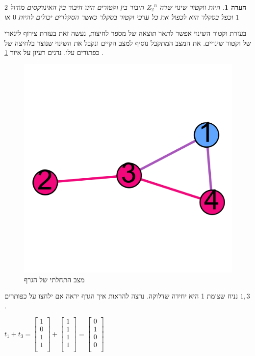 \documentclass[12pt,twoside]{article}
\newtheorem{comm}{הערה}[section]
\newcommand{\Zn}{{Z_2}^n}
\begin{document}

\begin{comm}
    היות ווקטור שינוי שדה
    $\Zn$
    חיבור בין וקטורים הינו חיבור בין האינדקסים מודול 
    $2$
    וכפל בסקלר
    הוא לכפול את כל ערכי וקטור בסקלר
    כאשר הסקלרים יכולים להיות
    $0$
    או 
    $1$
\end{comm}

בעזרת וקטור השינוי אפשר לתאר תוצאה של מספר לחיצות,
נעשה זאת בעזרת צירוף לינארי של וקטור שינויים.
את המצב המתקבל נוסיף למצב הקיים ונקבל את השינוי שנוצר בלחיצה של כפתורים
עלו.
נדגים רעיון על איור
\ref{fig:start graph presses}
.

\begin{figure}[ht]
    \caption{מצב התחלתי של הגרף}
    \label{fig:start graph presses}
    \centering
    \includegraphics[width=.7\textwidth,keepaspectratio]{images/graph_presses.png}
\end{figure}

נניח שצומת 1 היא יחידה שדלוקה.
נרצה להראות איך הגרף יראה אם ילחצו על כפותרים 
$1, 3$.

$
    t_1 + t_3 = 
    \begin{bmatrix}
        1 \\
        0 \\
        1 \\
        1 \\
    \end{bmatrix}
    +
    \begin{bmatrix}
        1 \\
        1 \\
        1 \\
        1 \\
    \end{bmatrix}
    =
    \begin{bmatrix}
        0 \\
        1 \\
        0 \\
        0 \\
    \end{bmatrix}
$
\end{document}

